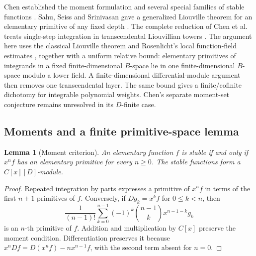 \documentclass[11pt,a4paper]{article}
\newtheorem{lemma}[theorem]{Lemma}
\theoremstyle{definition}
\theoremstyle{remark}
\numberwithin{equation}{section}
\begin{document}
Chen established the moment formulation and several special families of
stable functions \cite{stab:Chen}.  Sahu, Seiss and Srinivasan gave a
generalized Liouville theorem for an elementary primitive of any fixed
depth \cite{stab:SSS}.  The complete reduction of Chen et al. treats
single-step integration in transcendental Liouvillian towers
\cite{stab:CDGHLL}.  The argument here uses the classical Liouville theorem
\cite{stab:Rosenlicht} and Rosenlicht's local function-field estimates
\cite{stab:Rosenlicht1969}, together with a uniform relative bound:
elementary primitives of integrands in a fixed finite-dimensional
$B$-space lie in one finite-dimensional $B$-space modulo a lower field.
A finite-dimensional differential-module argument then removes one
transcendental layer. The same bound gives a finite/cofinite dichotomy
for integrable polynomial weights. Chen's separate moment-set
conjecture remains unresolved in its $D$-finite case.

\subsection{Moments and a finite primitive-space lemma}

\begin{lemma}[Moment criterion]\label{stab:moments}
An elementary function $f$ is stable if and only if $x^n f$ has an
elementary primitive for every $n\geq0$.  The stable functions form a
$C[x][D]$-module.
\end{lemma}
\begin{proof}
Repeated integration by parts expresses a primitive of $x^n f$ in terms
of the first $n+1$ primitives of $f$.  Conversely, if $Dg_k=x^k f$ for
$0\leq k<n$, then
\[
 \frac1{(n-1)!}\sum_{k=0}^{n-1}(-1)^k
       \binom{n-1}{k}x^{n-1-k}g_k
\]
is an $n$-th primitive of $f$.  Addition and multiplication by $C[x]$
preserve the moment condition.  Differentiation preserves it because
$x^n Df=D(x^n f)-n x^{n-1}f$, with the second term absent for $n=0$.
\end{proof}
\end{document}
